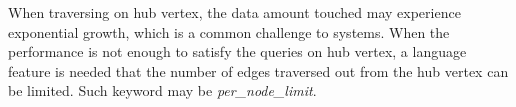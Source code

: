 
When traversing on hub vertex, the data amount touched may experience
exponential growth, which is a common challenge to systems. When the performance
is not enough to satisfy the queries on hub vertex, a language feature is needed
that the number of edges traversed out from the hub vertex can be limited. Such
keyword may be \emph{per\_node\_limit}.


